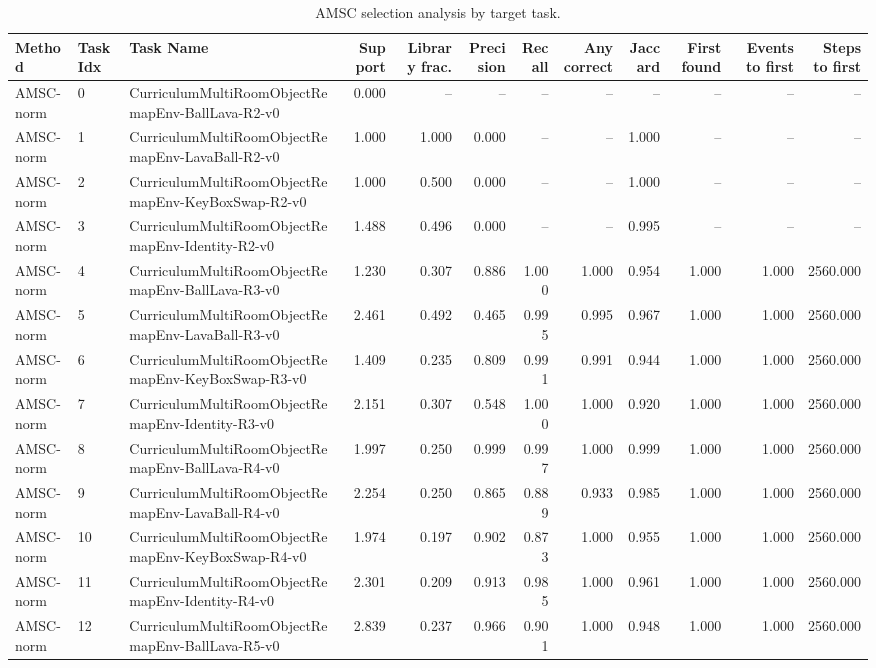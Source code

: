 \begin{table}[ht]
    \caption{AMSC selection analysis by target task.}
    \label{tbl:amsc_selection_task}
    \centering
    \scriptsize
    \begin{tabular}{lllrrrrrrrrr}
    \toprule
Method & Task Idx & Task Name & Support & Library frac. & Precision & Recall & Any correct & Jaccard & First found & Events to first & Steps to first \\
    \midrule
AMSC-norm & 0 & CurriculumMultiRoomObjectRemapEnv-BallLava-R2-v0 & 0.000 & -- & -- & -- & -- & -- & -- & -- & -- \\
AMSC-norm & 1 & CurriculumMultiRoomObjectRemapEnv-LavaBall-R2-v0 & 1.000 & 1.000 & 0.000 & -- & -- & 1.000 & -- & -- & -- \\
AMSC-norm & 2 & CurriculumMultiRoomObjectRemapEnv-KeyBoxSwap-R2-v0 & 1.000 & 0.500 & 0.000 & -- & -- & 1.000 & -- & -- & -- \\
AMSC-norm & 3 & CurriculumMultiRoomObjectRemapEnv-Identity-R2-v0 & 1.488 & 0.496 & 0.000 & -- & -- & 0.995 & -- & -- & -- \\
AMSC-norm & 4 & CurriculumMultiRoomObjectRemapEnv-BallLava-R3-v0 & 1.230 & 0.307 & 0.886 & 1.000 & 1.000 & 0.954 & 1.000 & 1.000 & 2560.000 \\
AMSC-norm & 5 & CurriculumMultiRoomObjectRemapEnv-LavaBall-R3-v0 & 2.461 & 0.492 & 0.465 & 0.995 & 0.995 & 0.967 & 1.000 & 1.000 & 2560.000 \\
AMSC-norm & 6 & CurriculumMultiRoomObjectRemapEnv-KeyBoxSwap-R3-v0 & 1.409 & 0.235 & 0.809 & 0.991 & 0.991 & 0.944 & 1.000 & 1.000 & 2560.000 \\
AMSC-norm & 7 & CurriculumMultiRoomObjectRemapEnv-Identity-R3-v0 & 2.151 & 0.307 & 0.548 & 1.000 & 1.000 & 0.920 & 1.000 & 1.000 & 2560.000 \\
AMSC-norm & 8 & CurriculumMultiRoomObjectRemapEnv-BallLava-R4-v0 & 1.997 & 0.250 & 0.999 & 0.997 & 1.000 & 0.999 & 1.000 & 1.000 & 2560.000 \\
AMSC-norm & 9 & CurriculumMultiRoomObjectRemapEnv-LavaBall-R4-v0 & 2.254 & 0.250 & 0.865 & 0.889 & 0.933 & 0.985 & 1.000 & 1.000 & 2560.000 \\
AMSC-norm & 10 & CurriculumMultiRoomObjectRemapEnv-KeyBoxSwap-R4-v0 & 1.974 & 0.197 & 0.902 & 0.873 & 1.000 & 0.955 & 1.000 & 1.000 & 2560.000 \\
AMSC-norm & 11 & CurriculumMultiRoomObjectRemapEnv-Identity-R4-v0 & 2.301 & 0.209 & 0.913 & 0.985 & 1.000 & 0.961 & 1.000 & 1.000 & 2560.000 \\
AMSC-norm & 12 & CurriculumMultiRoomObjectRemapEnv-BallLava-R5-v0 & 2.839 & 0.237 & 0.966 & 0.901 & 1.000 & 0.948 & 1.000 & 1.000 & 2560.000 \\

\end{tabular}
\end{table}
